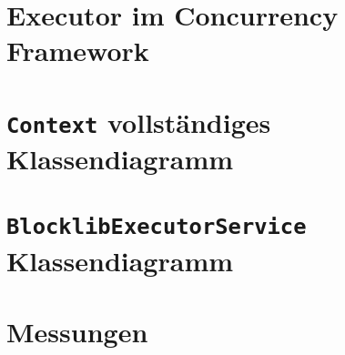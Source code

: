 \appendix
\clearpage
\renewcommand{\sectionmark}[1]{\markboth{\Ifnumbered{section}{Anhang \thesection}{}}{#1}}
\setcounter{page}{1}


\section{Executor im Concurrency Framework}\label{appendix:concFrameworkExecutor}


\pagebreak
\section{\texttt{Context} vollständiges Klassendiagramm}\label{appendix:context}
{
	\centering
	
}

\pagebreak
\section{\texttt{BlocklibExecutorService} Klassendiagramm}\label{appendix:BlocklibExecutorService}
{
	\centering
	
}
\pagebreak
\section{Messungen}
\pgfplotsset{
	height=3cm,
}
